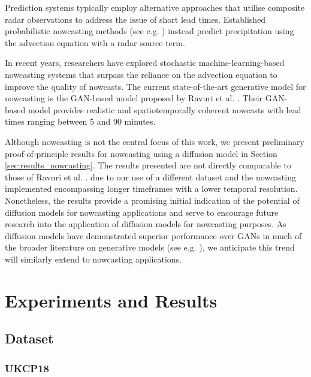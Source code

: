 \documentclass[ oneside,%
                    author={George Herbert},
                    degree={MSci},
                     title={Diffusion Models for Time-Evolving Precipitation Fields},
                  subtitle={}]{dissertation}
\begin{document}
Prediction systems typically employ alternative approaches that utilise composite radar observations to address the issue of short lead times. Established probabilistic nowcasting methods (see e.g. \cite{Bowler_STEPS}) instead predict precipitation using the advection equation with a radar source term.

In recent years, researchers have explored stochastic machine-learning-based nowcasting systems that surpass the reliance on the advection equation to improve the quality of nowcasts. The current state-of-the-art generative model for nowcasting is the GAN-based model proposed by Ravuri et al. \cite{Ravuri_Skillful_Precipitation_Nowcasting}. Their GAN-based model provides realistic and spatiotemporally coherent nowcasts with lead times ranging between 5 and 90 minutes.

Although nowcasting is not the central focus of this work, we present preliminary proof-of-principle results for nowcasting using a diffusion model in Section \ref{sec:results_nowcasting}. The results presented are not directly comparable to those of Ravuri et al. \cite{Ravuri_Skillful_Precipitation_Nowcasting}. due to our use of a different dataset and the nowcasting implemented encompassing longer timeframes with a lower temporal resolution. Nonetheless, the results provide a promising initial indication of the potential of diffusion models for nowcasting applications and serve to encourage future research into the application of diffusion models for nowcasting purposes. As diffusion models have demonstrated superior performance over GANs in much of the broader literature on generative models (see e.g. \cite{DDPM_Ho, Cascaded_Ho, Imagen_Saharia}), we anticipate this trend will similarly extend to nowcasting applications.


\chapter{Experiments and Results}
\label{chap:results}

\section{Dataset}
\label{sec:results_dataset}

\subsection{UKCP18}
\label{sec:results_dataset_ukcp18}
\end{document}
